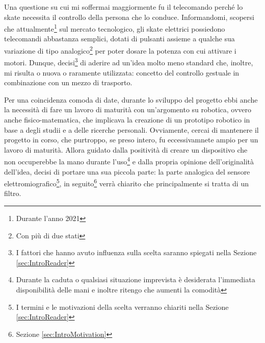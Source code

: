 \documentclass[a4paper, 10pt, final]{article} %
\begin{document}
    Una questione su cui mi soffermai maggiormente fu il telecomando perch\'{e} lo skate necessita il controllo della persona che lo conduce.
    Informandomi, scopersi che attualmente\footnote{Durante l'anno 2021} sul mercato tecnologico, gli skate elettrici possiedono telecomandi abbastanza semplici, dotati di pulsanti assieme a qualche sua variazione di tipo analogico\footnote{Con pi\`{u} di due stati} per poter dosare la potenza con cui attivare i motori.
    Dunque, decisi\footnote{I fattori che hanno avuto influenza sulla scelta saranno spiegati nella Sezione \ref{sec:IntroReader}} di aderire ad un'idea molto meno standard che, inoltre, mi risulta o nuova o raramente utilizzata: concetto del controllo gestuale in combinazione con un mezzo di trasporto.
    
    Per una coincidenza comoda di date, durante lo sviluppo del progetto ebbi anche la necessit\`{a} di fare un lavoro di maturit\`{a} con un'argomento su robotica, ovvero anche fisico-matematica, che implicava la creazione di un prototipo robotico in base a degli studii e a delle ricerche personali. Ovviamente, cercai di mantenere il progetto in corso, che purtroppo, se preso intero, fu eccessivamnete ampio per un lavoro di maturit\`{a}. Allora guidato dalla positivit\`{a} di creare un dispositivo che non occuperebbe la mano durante l'uso\footnote{Durante la caduta o qualsiasi situazione imprevista \`{e} desiderata l'immediata disponibilit\`{a} delle mani e inoltre ritengo che aumenti la comodit\`{a}} e dalla propria opinione dell'originalit\`{a} dell'idea, decisi di portare una sua piccola parte: la parte analogica del sensore elettromiografico\footnote{I termini e le motivazioni della scelta verranno chiariti nella Sezione \ref{sec:IntroReader}}, in seguito\footnote{Sezione \ref{sec:IntroMotivation}} verr\`{a} chiarito che principalmente si tratta di un filtro.
    
\end{document}
